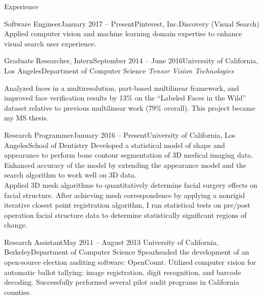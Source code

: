 \documentclass{resume}
\begin{document}
\begin{component}{Experience}
  \begin{position}{Software Engineer}{January 2017 -- Present}{Pinterest, Inc.}{Discovery (Visual Search)}
    {Applied computer vision and machine learning domain expertise to enhance visual search user experience.}
  \end{position}
  
	\begin{position}{Graduate Researcher, Intern}{September 2014 -- June 2016}{University of California, Los Angeles}{Department of Computer Science}
	\emph{Tensor Vision Technologies}

    {Analyzed faces in a multiresolution, part-based multilinear framework, and improved face verification results by 13\% on the ``Labeled Faces in the Wild'' dataset relative to previous multilinear work (79\% overall).
This project became my MS thesis.
}
	\end{position}

\vspace{-0.25em}

    \begin{position}{Research Programmer}{January 2016 -- Present}{University of California, Los Angeles}{School of Dentistry}
{
Developed a statistical model of shape and appearance to perform bone contour segmentation of 3D medical imaging data.
Enhanced accuracy of the model by extending the appearance model and the search algorithm to work well on 3D data.
\\
Applied 3D mesh algorithms to quantitatively determine facial surgery effects on facial structure.
After achieving mesh correspondence by applying a nonrigid iterative closest point registration algorithm, I ran statistical tests on pre/post operation facial structure data to determine statistically significant regions of change.
}
      \end{position}

\vspace{-0.25em}

	\begin{position}{Research Assistant}{May 2011 -- August 2013}
	 	{University of California, Berkeley}{Department of Computer Science}
	{Spearheaded the development of an open-source election auditing software: OpenCount.
     Utilized computer vision for automatic ballot tallying: image registration, digit recognition, and barcode decoding.
     Successfully performed
         several pilot audit programs in California counties.
}
	\end{position}


\end{component}
\end{document}
